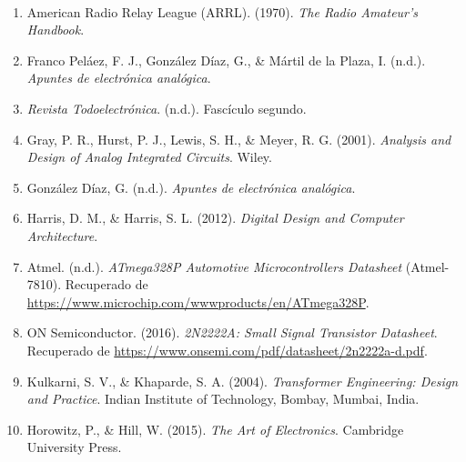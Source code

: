 \paragraph{}
\begin{enumerate}
\item American Radio Relay League (ARRL). (1970). \textit{The Radio Amateur's Handbook}.
\item Franco Peláez, F. J., González Díaz, G., \& Mártil de la Plaza, I. (n.d.). \textit{Apuntes de electrónica analógica}.
\item \textit{Revista Todoelectrónica}. (n.d.). Fascículo segundo.
\item Gray, P. R., Hurst, P. J., Lewis, S. H., \& Meyer, R. G. (2001). \textit{Analysis and Design of Analog Integrated Circuits}. Wiley.
\item González Díaz, G. (n.d.). \textit{Apuntes de electrónica analógica}.
\item Harris, D. M., \& Harris, S. L. (2012). \textit{Digital Design and Computer Architecture}. 
\item Atmel. (n.d.). \textit{ATmega328P Automotive Microcontrollers Datasheet} (Atmel-7810). Recuperado de \url{https://www.microchip.com/wwwproducts/en/ATmega328P}.
\item ON Semiconductor. (2016). \textit{2N2222A: Small Signal Transistor Datasheet}. Recuperado de \url{https://www.onsemi.com/pdf/datasheet/2n2222a-d.pdf}.
\item Kulkarni, S. V., \& Khaparde, S. A. (2004). \textit{Transformer Engineering: Design and Practice}. Indian Institute of Technology, Bombay, Mumbai, India.
\item Horowitz, P., \& Hill, W. (2015). \textit{The Art of Electronics}. Cambridge University Press.
\end{enumerate}
